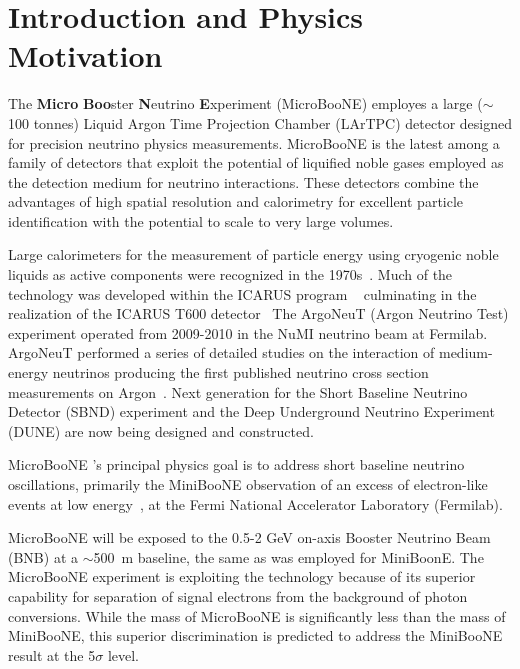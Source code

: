 \section{Introduction and Physics Motivation}

The {\bf{Micro}} {\bf{Boo}}ster {\bf{N}}eutrino {\bf{E}}xperiment (MicroBooNE) employes a large ($\sim$100 tonnes) Liquid Argon Time Projection Chamber (LArTPC) detector designed for precision neutrino physics measurements.   MicroBooNE is the latest among a family of detectors that exploit the potential of liquified noble gases employed as the detection medium for neutrino interactions.   These detectors combine the advantages of high spatial resolution and calorimetry for excellent particle identification with the potential to scale to very large volumes. 

Large calorimeters for the measurement of particle energy using cryogenic noble liquids as active components were recognized in the 1970s~\cite{Willis:1974}.  Much of the \lartpc technology was developed within the ICARUS program ~\cite{Benetti:1993-3ton,Cennini:1994-3ton,Arneodo:1999-50l} culminating in the realization of the ICARUS T600 detector~\cite{Amerio:2004-T600}   The ArgoNeuT (Argon Neutrino Test) experiment operated from 2009-2010 in the NuMI neutrino beam at Fermilab.   ArgoNeuT performed a series of detailed studies on the interaction of medium-energy neutrinos \cite{Acciarri:2013-argoneut-recomb}  producing the first published neutrino cross section measurements on Argon~\cite{Anderson:2012-argoneut-CCincl,Acciarri:2014-argoneut-CCxsec,Acciarri:2014eit}.   Next generation \lartpcs for the Short Baseline Neutrino Detector (SBND) experiment and the Deep Underground Neutrino Experiment (DUNE) are now being designed and constructed.   
   
MicroBooNE 's principal physics goal is to address short baseline neutrino oscillations, primarily the MiniBooNE observation of an excess of electron-like events at low energy~\cite{AguilarArevalo:2008rc}, at the Fermi National Accelerator Laboratory (Fermilab).  


MicroBooNE will be exposed to the  0.5-2 GeV on-axis Booster Neutrino Beam (BNB) at a $\sim$500~m baseline, the same as was employed for MiniBoonE.  The MicroBooNE experiment is exploiting the \lartpc technology because of its superior capability for separation of signal electrons from the background of photon conversions.   While the mass of MicroBooNE is significantly less than the mass of MiniBooNE, this superior discrimination is predicted to address the MiniBooNE result at the 5$\sigma$ level.   

